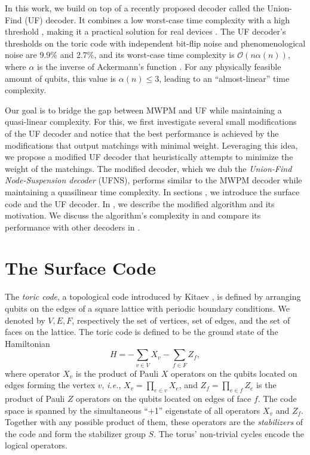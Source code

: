 In this work, we build on top of a recently proposed decoder called the Union-Find (UF) decoder. It combines a low worst-case time complexity with a high threshold \cite{delfosse2017almost}, making it a practical solution for real devices \cite{huang2020fault,delfosse2020hierarchical,das2020scalable}. The UF decoder's thresholds on the toric code with independent bit-flip noise and phenomenological noise are $9.9\%$ and $2.7\%$, and its worst-case time complexity is $\mathcal{O}(n\alpha(n))$, where $\alpha$ is the inverse of Ackermann's function \cite{tarjan1975efficiency}. For any physically feasible amount of qubits, this value is $\alpha(n) \leq 3$, leading to an ``almost-linear'' time complexity. 

Our goal is to bridge the gap between MWPM and UF while maintaining a quasi-linear complexity. For this, we first investigate several small modifications of the UF decoder and notice that the best performance is achieved by the modifications that output matchings with minimal weight. Leveraging this idea, we propose a modified UF decoder that heuristically attempts to minimize the weight of the matchings. The modified decoder, which we dub the \emph{Union-Find Node-Suspension decoder} (UFNS), performs similar to the MWPM decoder while maintaining a quasilinear time complexity. In sections , we introduce the surface code and the UF decoder. In , we describe the modified algorithm and its motivation. We discuss the algorithm's complexity in  and compare its performance with other decoders in .  

\section{The Surface Code}\label{sec:surfacecode}

The \emph{toric code}, a topological code introduced by Kitaev \cite{kitaev2003fault}, is defined by arranging qubits on the edges of a square lattice with periodic boundary conditions. We denoted by $V,E,F$, respectively the set of vertices, set of edges, and the set of faces on the lattice. The toric code is defined to be the ground state of the Hamiltonian 
\begin{equation}
    H = -\sum_{v \in V} X_v -\sum_{f \in F} Z_f, 
\end{equation}
where operator $X_v$ is the product of Pauli $X$ operators on the qubits located on edges forming the vertex $v$, \emph{i.e.}, $X_v = \prod_{e \in v} X_e$, and $Z_f = \prod_{e \in f} Z_e$ is the product of Pauli $Z$ operators on the qubits located on edges of face $f$. The code space is spanned by the simultaneous ``+1'' eigenstate of all operators $X_v$ and $Z_f$. Together with any possible product of them, these operators are the \emph{stabilizers} of the code and form the stabilizer group $S$. The torus' non-trivial cycles encode the logical operators. %

